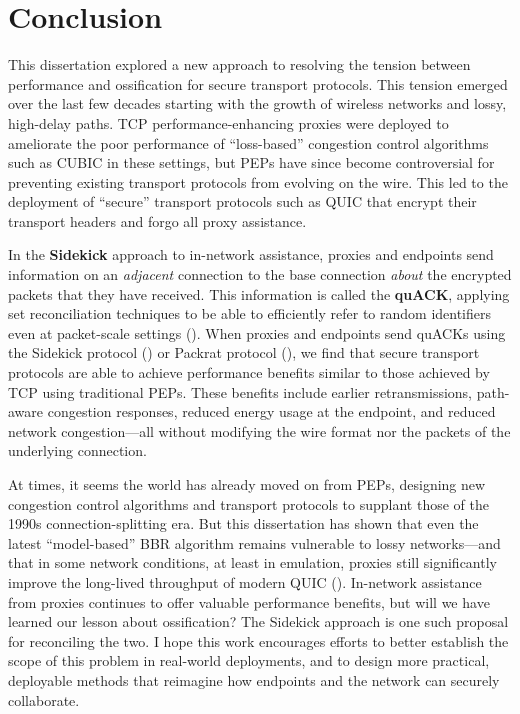 \chapter{Conclusion}
\label{sec:conclusion}

This dissertation explored a new approach to resolving the tension between
performance and ossification for secure transport protocols. This tension
emerged over the last few decades starting with the growth of wireless networks
and lossy, high-delay paths. TCP performance-enhancing proxies were deployed to
ameliorate the poor performance of ``loss-based'' congestion control algorithms
such as CUBIC in these settings, but PEPs have since become controversial for
preventing existing transport protocols from evolving on the wire. This led to
the deployment of ``secure'' transport protocols such as QUIC that encrypt
their transport headers and forgo all proxy assistance.

In the \textbf{Sidekick} approach to in-network assistance, proxies and
endpoints send information on an \textit{adjacent} connection to the base
connection \textit{about} the encrypted packets that they have received. This
information is called the \textbf{quACK}, applying set reconciliation
techniques to be able to efficiently refer to random identifiers even at
packet-scale settings (). When proxies and endpoints send
quACKs using the Sidekick protocol () or Packrat protocol
(), we find that secure transport protocols are able to
achieve performance benefits similar to those achieved by TCP using traditional
PEPs. These benefits include earlier retransmissions, path-aware congestion
responses, reduced energy usage at the endpoint, and reduced network
congestion---all without modifying the wire format nor the packets of the
underlying connection.

At times, it seems the world has already moved on from PEPs, designing new
congestion control algorithms and transport protocols to supplant those of the
1990s connection-splitting era. But this dissertation has shown that even the
latest ``model-based'' BBR algorithm remains vulnerable to lossy networks---and
that in some network conditions, at least in emulation, proxies still
significantly improve the long-lived throughput of modern QUIC
(). In-network assistance from proxies continues to offer
valuable performance benefits, but will we have learned our lesson about
ossification? The Sidekick approach is one such proposal for reconciling the
two. I hope this work encourages efforts to better establish the scope of this
problem in real-world deployments, and to design more practical, deployable
methods that reimagine how endpoints and the network can securely collaborate.

